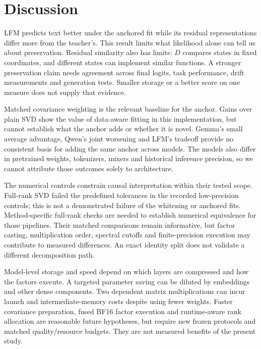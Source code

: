 \documentclass[conference]{IEEEtran}
\begin{document}
\section{Discussion}
LFM predicts text better under the anchored fit while its residual representations differ more from the teacher's. This result limits what likelihood alone can tell us about preservation. Residual similarity also has limits: $D$ compares states in fixed coordinates, and different states can implement similar functions. A stronger preservation claim needs agreement across final logits, task performance, drift measurements and generation tests. Smaller storage or a better score on one measure does not supply that evidence.\par\smallskip
Matched covariance weighting is the relevant baseline for the anchor. Gains over plain SVD show the value of data-aware fitting in this implementation, but cannot establish what the anchor adds or whether it is novel. Gemma's small average advantage, Qwen's joint worsening and LFM's tradeoff provide no consistent basis for adding the same anchor across models. The models also differ in pretrained weights, tokenizers, mixers and historical inference precision, so we cannot attribute those outcomes solely to architecture.\par\smallskip
The numerical controls constrain causal interpretation within their tested scope. Full-rank SVD failed the predefined tolerances in the recorded low-precision controls; this is not a demonstrated failure of the whitening or anchored fits. Method-specific full-rank checks are needed to establish numerical equivalence for those pipelines. Their matched comparisons remain informative, but factor casting, multiplication order, spectral cutoffs and finite-precision execution may contribute to measured differences. An exact identity split does not validate a different decomposition path.\par\smallskip
Model-level storage and speed depend on which layers are compressed and how the factors execute. A targeted parameter saving can be diluted by embeddings and other dense components. Two dependent matrix multiplications can incur launch and intermediate-memory costs despite using fewer weights. Faster covariance preparation, fused BF16 factor execution and runtime-aware rank allocation are reasonable future hypotheses, but require new frozen protocols and matched quality/resource budgets. They are not measured benefits of the present study.\par\smallskip
\end{document}
